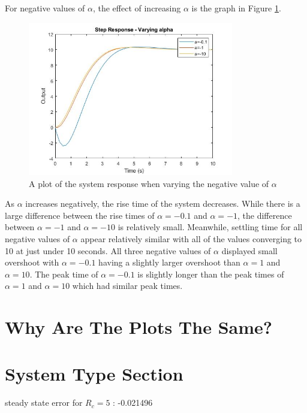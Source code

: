 For negative values of $\alpha$, the effect of increasing $\alpha$ is the graph in Figure \ref{fig:varying-alpha-negative}.
\begin{figure}[H]
	\centering
	\includegraphics[width=0.8\textwidth]{./figures/lab4_fig4-part4-3-2-negative.jpg}
	\caption{A plot of the system response when varying the negative value of $\alpha$}
	\label{fig:varying-alpha-negative}
\end{figure}
As $\alpha$ increases negatively, the rise time of the system decreases. While there is a large difference between the rise times of $\alpha = -0.1$ and $\alpha = -1$, the difference between $\alpha = -1$ and $\alpha = -10$ is relatively small. Meanwhile, settling time for all negative values of $\alpha$ appear relatively similar with all of the values converging to 10 at just under 10 seconds. All three negative values of $\alpha$ displayed small overshoot with $\alpha = -0.1$ having a slightly larger overshoot than $\alpha =1$ and $\alpha = 10$. The peak time of $\alpha = -0.1$ is slightly longer than the peak times of $\alpha = 1$ and $\alpha = 10$ which had similar peak times.

\section{Why Are The Plots The Same?}


\section{System Type Section}


steady state error for $R_{c} = 5$ : -0.021496
